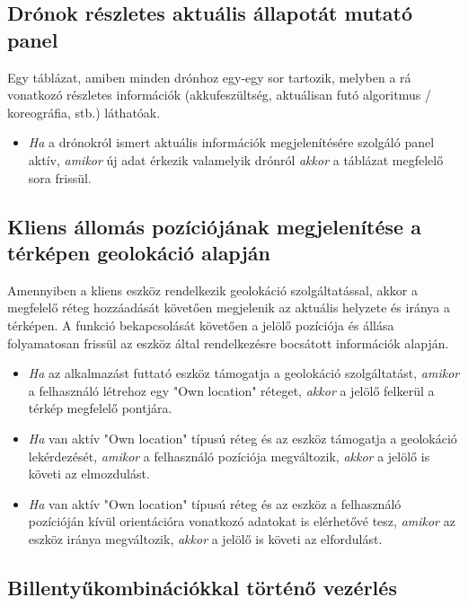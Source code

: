 \subsection{Drónok részletes aktuális állapotát mutató panel}

Egy táblázat, amiben minden drónhoz egy-egy sor tartozik, melyben a rá vonatkozó részletes információk (akkufeszültség, aktuálisan futó algoritmus / koreográfia, stb.) láthatóak.

\begin {itemize}
  \item \textit{Ha} a drónokról ismert aktuális információk megjelenítésére szolgáló panel aktív, \textit{amikor} új adat érkezik valamelyik drónról \textit{akkor} a táblázat megfelelő sora frissül.
\end {itemize}


\subsection{Kliens állomás pozíciójának megjelenítése a térképen geolokáció alapján}

Amennyiben a kliens eszköz rendelkezik geolokáció szolgáltatással, akkor a megfelelő réteg hozzáadását követően megjelenik az aktuális helyzete és iránya a térképen.
A funkció bekapcsolását követően a jelölő pozíciója és állása folyamatosan frissül az eszköz által rendelkezésre bocsátott információk alapján.

\begin {itemize}
  \item \textit{Ha} az alkalmazást futtató eszköz támogatja a geolokáció szolgáltatást, \textit{amikor} a felhasználó létrehoz egy "Own location" réteget, \textit{akkor} a jelölő felkerül a térkép megfelelő pontjára.
  \item \textit{Ha} van aktív "Own location" típusú réteg és az eszköz támogatja a geolokáció lekérdezését, \textit{amikor} a felhasználó pozíciója megváltozik, \textit{akkor} a jelölő is követi az elmozdulást.
  \item \textit{Ha} van aktív "Own location" típusú réteg és az eszköz a felhasználó pozícióján kívül orientációra vonatkozó adatokat is elérhetővé tesz, \textit{amikor} az eszköz iránya megváltozik, \textit{akkor} a jelölő is követi az elfordulást.
\end {itemize}


\subsection{Billentyűkombinációkkal történő vezérlés}

